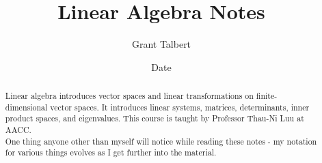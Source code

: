 \documentclass[12pt, letterpaper]{report}
\title{Linear Algebra Notes}
\author{Grant Talbert}
\date{Date}
\begin{document}
	\maketitle
	
	\begin{abstract}
		Linear algebra introduces vector spaces and linear transformations on finite-dimensional vector spaces. It introduces linear systems, matrices, determinants, inner product spaces, and eigenvalues. This course is taught by Professor Thau-Ni Luu at AACC.\\
		One thing anyone other than myself will notice while reading these notes - my notation for various things evolves as I get further into the material.
	\end{abstract}
	
	\newpage
	
	\tableofcontents
	
	\newpage



%

\end{document}
